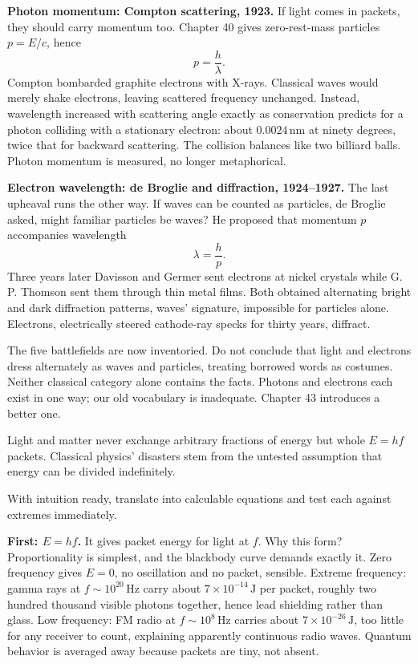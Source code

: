 \textbf{Photon momentum: Compton scattering, 1923.} If light comes in packets, they should carry momentum too. Chapter 40 gives zero-rest-mass particles \(p = E/c\), hence
\[
p = \frac{h}{\lambda}.
\]
Compton bombarded graphite electrons with X-rays. Classical waves would merely shake electrons, leaving scattered frequency unchanged. Instead, wavelength increased with scattering angle exactly as conservation predicts for a photon colliding with a stationary electron: about \(0.0024\,\mathrm{nm}\) at ninety degrees, twice that for backward scattering. The collision balances like two billiard balls. Photon momentum is measured, no longer metaphorical.

\textbf{Electron wavelength: de Broglie and diffraction, 1924--1927.} The last upheaval runs the other way. If waves can be counted as particles, de Broglie asked, might familiar particles be waves? He proposed that momentum \(p\) accompanies wavelength
\[
\lambda = \frac{h}{p}.
\]
Three years later Davisson and Germer sent electrons at nickel crystals while G. P. Thomson sent them through thin metal films. Both obtained alternating bright and dark diffraction patterns, waves' signature, impossible for particles alone. Electrons, electrically steered cathode-ray specks for thirty years, diffract.

The five battlefields are now inventoried. Do not conclude that light and electrons dress alternately as waves and particles, treating borrowed words as costumes. Neither classical category alone contains the facts. Photons and electrons each exist in one way; our old vocabulary is inadequate. Chapter 43 introduces a better one.


\begin{oneline}
Light and matter never exchange arbitrary fractions of energy but whole \(E = hf\) packets. Classical physics' disasters stem from the untested assumption that energy can be divided indefinitely.
\end{oneline}


With intuition ready, translate into calculable equations and test each against extremes immediately.

\textbf{First: \(E = hf\).} It gives packet energy for light at \(f\). Why this form? Proportionality is simplest, and the blackbody curve demands exactly it. Zero frequency gives \(E = 0\), no oscillation and no packet, sensible. Extreme frequency: gamma rays at \(f \sim 10^{20}\,\mathrm{Hz}\) carry about \(7\times10^{-14}\,\mathrm{J}\) per packet, roughly two hundred thousand visible photons together, hence lead shielding rather than glass. Low frequency: FM radio at \(f \sim 10^{8}\,\mathrm{Hz}\) carries about \(7\times10^{-26}\,\mathrm{J}\), too little for any receiver to count, explaining apparently continuous radio waves. Quantum behavior is averaged away because packets are tiny, not absent.

